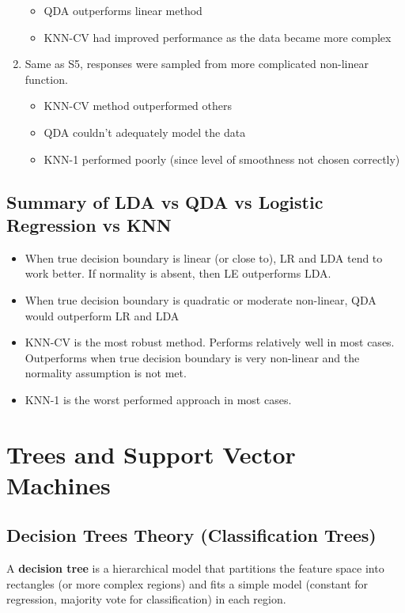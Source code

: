 \documentclass[11pt]{article}
\begin{document}
\begin{enumerate}
        \begin{itemize}
            \item QDA outperforms linear method
            \item KNN-CV had improved performance as the data became more complex
        \end{itemize}
    \item Same as S5, responses were sampled from more complicated non-linear function.
        \begin{itemize}
            \item KNN-CV method outperformed others
            \item QDA couldn't adequately model the data
            \item KNN-1 performed poorly (since level of smoothness not chosen correctly)
        \end{itemize}
\end{enumerate}

\subsection{Summary of LDA vs QDA vs Logistic Regression vs KNN}
\begin{itemize}
    \item When true decision boundary is linear (or close to), LR and LDA tend to work better. If normality is absent, then LE outperforms LDA.
    \item When true decision boundary is quadratic or moderate non-linear, QDA would outperform LR and LDA
    \item KNN-CV is the most robust method. Performs relatively well in most cases. Outperforms when true decision boundary is very non-linear and the normality assumption is not met.
    \item KNN-1 is the worst performed approach in most cases.
\end{itemize}

\newpage

\section{Trees and Support Vector Machines}

\subsection{Decision Trees Theory (Classification Trees)}
A \textbf{decision tree} is a hierarchical model that partitions the feature space into rectangles (or more complex regions) and fits a simple model (constant for regression, majority vote for classification) in each region. \\
\end{document}
